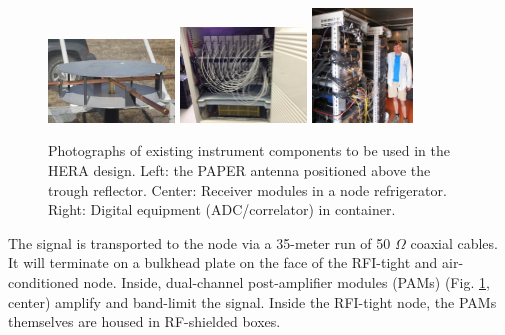 \documentclass[preprint]{aastex}
\begin{document}
\begin{figure}[h]
	\centering
		\includegraphics[width=0.3\textwidth]{plots/new_antenna_closeup.jpg}
		\includegraphics[width=0.3\textwidth]{plots/Engineering/recv_node.png}
		\includegraphics[width=0.24\textwidth]{plots/Engineering/digital.png}
	\caption{\small
	Photographs of existing instrument components to be used in the HERA design.
    Left: the PAPER antenna positioned above the trough reflector.
    Center: Receiver modules in a node refrigerator.
    Right: Digital equipment (ADC/correlator) in container.}\label{fig:components}
\end{figure}

The signal is transported to the node via a 35-meter run of 50 $\Omega$ coaxial
cables. It will terminate on a bulkhead plate on the face of the RFI-tight and
air-conditioned node. Inside, dual-channel post-amplifier modules (PAMs) (Fig.
\ref{fig:components}, center) amplify and band-limit the signal. Inside the RFI-tight node,
the PAMs themselves are housed in RF-shielded boxes.
\end{document}
